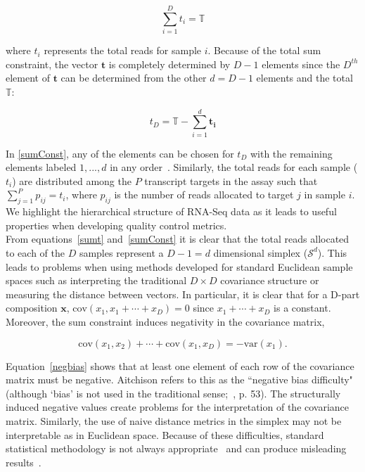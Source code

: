 \documentclass{article}\usepackage[]{graphicx}\usepackage[]{color}
\theoremstyle{definition}
\begin{document}
\begin{equation}
\sum_{i=1}^{D} t_i = \mathbb{T}
\label{sumt}
\end{equation}

where $t_i$ represents the total reads for sample $i$.  Because of the total sum constraint, the vector $\mathbf{t}$ is completely determined by $D-1$ elements since the $D^{th}$ element of $\mathbf{t}$ can be determined from the other $d = D-1$ elements and the total $\mathbb{T}$:  

\begin{equation}
t_D = \mathbb{T} - \sum_{i=1}^{d} \mathbf{t_i}
\label{sumConst}
\end{equation}

In \ref{sumConst}, any of the elements can be chosen for $t_D$ with the remaining elements labeled $1, ..., d$ in any order~\cite{Aitchison1986}.  Similarly, the total reads for each sample ($t_i$) are distributed among the $P$ transcript targets in the assay such that $\sum_{j=1}^{P} p_{ij} = t_i$, where $p_{ij}$ is the number of reads allocated to target $j$ in sample $i$.  We highlight the hierarchical structure of RNA-Seq data as it leads to useful properties when developing quality control metrics.\\


From equations~\ref{sumt} and~\ref{sumConst} it is clear that the total reads allocated to each of the $D$ samples represent a $D - 1 = d$ dimensional simplex ($\mathcal{S}^d$). This leads to problems when using methods developed for standard Euclidean sample spaces such as interpreting the traditional $D \times D$ covariance structure or measuring the distance between vectors.  In particular, it is clear that for a D-part composition $\mathbf{x}$, $\text{cov}(x_1, x_1+ \cdots +x_D) = 0$  since $x_1 + \cdots + x_D$ is a constant.  Moreover, the sum constraint induces negativity in the covariance matrix,

\begin{equation}
\text{cov}(x_1, x_2) + \cdots + \text{cov}(x_1, x_D) = -\text{var}(x_1).
\label{negbias}
\end{equation}

Equation~\ref{negbias} shows that at least one element of each row of the covariance matrix must be negative. Aitchison refers to this as the ``negative bias difficulty" (although `bias' is not used in the traditional sense;~\cite{Aitchison1986}, p. 53). The structurally induced negative values create problems for the interpretation of the covariance matrix.  Similarly, the use of naive distance metrics in the simplex may not be interpretable as in Euclidean space. Because of these difficulties, standard statistical methodology is not always appropriate~\cite{Aitchison1986} and can produce misleading results~\cite{Lovell2015}.\\
\end{document}
